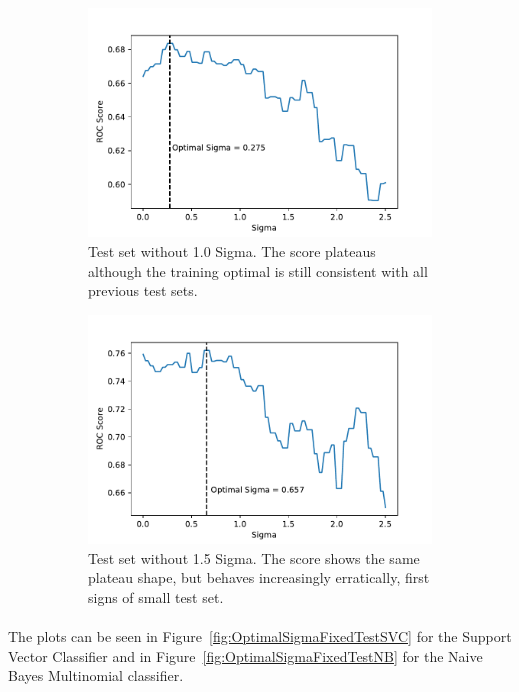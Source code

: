 \documentclass[12pt,a4paper]{report}
\begin{document}
\begin{figure}
\begin{subfigure}[b]{0.49\textwidth}
        \includegraphics[width=\textwidth]{imgs/180531_Sigma_fixed_test_10.pdf}
        \caption{Test set without 1.0 Sigma. The score plateaus although the training optimal is still consistent with all previous test sets.}
        \label{fig:}
    \end{subfigure}
    \begin{subfigure}[b]{0.49\textwidth}
        \includegraphics[width=\textwidth]{imgs/180531_Sigma_fixed_test_15.pdf}
        \caption{Test set without 1.5 Sigma. The score shows the same plateau shape, but behaves increasingly erratically, first signs of small test set.}
        \label{fig:}
    \end{subfigure}
    \caption{}
    \label{fig:testingthresholds}
\end{figure}


\paragraph{} The plots can be seen in Figure~\ref{fig:OptimalSigmaFixedTestSVC} for the Support Vector Classifier and in Figure~\ref{fig:OptimalSigmaFixedTestNB} for the Naive Bayes Multinomial classifier.
\end{document}
